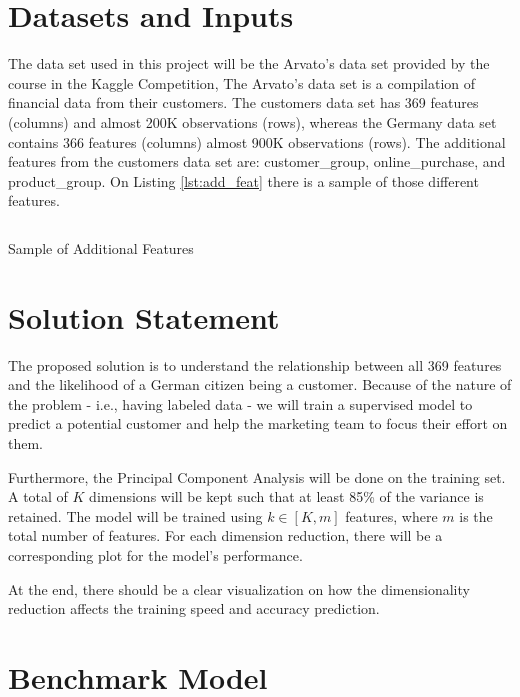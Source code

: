 \hypertarget{datasets-and-inputs}{%
\section{Datasets and Inputs}\label{datasets-and-inputs}}

The data set used in this project will be the Arvato's data set provided
by the course in the Kaggle Competition\cite{arvato_kaggle_competition},
The Arvato's data set is a compilation of financial data from their
customers. The customers data set has 369 features (columns) and almost
200K observations (rows), whereas the Germany data set contains 366
features (columns) almost 900K observations (rows). The additional
features from the customers data set are: customer\_group,
online\_purchase, and product\_group. On Listing \ref{lst:add_feat}
there is a sample of those different features.

\begin{listing}[htp]
  \inputminted{python}{code/sample_additional_features.py}
  \caption{Sample of Additional Features}
  \label{lst:add_feat}
\end{listing}

\hypertarget{solution-statement}{%
\section{Solution Statement}\label{solution-statement}}

The proposed solution is to understand the relationship between all 369
features and the likelihood of a German citizen being a customer.
Because of the nature of the problem - i.e., having labeled data - we
will train a supervised model to predict a potential customer and help
the marketing team to focus their effort on them.

Furthermore, the Principal Component Analysis will be done on the
training set. A total of \(K\) dimensions will be kept such that at
least 85\% of the variance is retained. The model will be trained using
\(k \in \left[K,m\right]\) features, where \(m\) is the total number of
features. For each dimension reduction, there will be a corresponding
plot for the model's performance.

At the end, there should be a clear visualization on how the
dimensionality reduction affects the training speed and accuracy
prediction.

\hypertarget{benchmark-model}{%
\section{Benchmark Model}\label{benchmark-model}}

